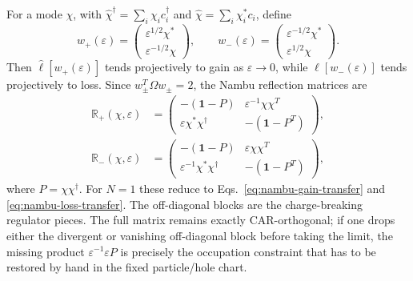 \documentclass[aps,prb,onecolumn,nofootinbib,superscriptaddress]{revtex4-2}
\newcommand{\I}{\mathbf{1}}
\theoremstyle{plain}
\theoremstyle{definition}
\begin{document}
For a mode \(\chi\), with
\(\hat\chi^\dagger=\sum_i\chi_i c_i^\dagger\) and
\(\hat\chi=\sum_i\chi_i^*c_i\), define
\begin{equation}
  w_+(\varepsilon)=
  \begin{pmatrix}\varepsilon^{1/2}\chi^*\\ \varepsilon^{-1/2}\chi\end{pmatrix},
  \qquad
  w_-(\varepsilon)=
  \begin{pmatrix}\varepsilon^{-1/2}\chi^*\\ \varepsilon^{1/2}\chi\end{pmatrix} .
  \label{eq:nambu-regulated-gain-loss-vectors}
\end{equation}
Then \(\hat\ell[w_+(\varepsilon)]\) tends projectively to gain as
\(\varepsilon\to0\), while \(\hat\ell[w_-(\varepsilon)]\) tends projectively
to loss.  Since \(w_\pm^T\Omega w_\pm=2\), the Nambu reflection matrices are
\begin{align}
  \mathbb R_+(\chi,\varepsilon)
  &=
  \begin{pmatrix}
    -(\I-P) & \varepsilon^{-1}\chi\chi^T\\
    \varepsilon\chi^*\chi^\dagger & -(\I-P^T)
  \end{pmatrix},
  \label{eq:nambu-regulated-gain-matrix}\\
  \mathbb R_-(\chi,\varepsilon)
  &=
  \begin{pmatrix}
    -(\I-P) & \varepsilon\chi\chi^T\\
    \varepsilon^{-1}\chi^*\chi^\dagger & -(\I-P^T)
  \end{pmatrix},
  \label{eq:nambu-regulated-loss-matrix}
\end{align}
where \(P=\chi\chi^\dagger\).  For \(N=1\) these reduce to
Eqs.~\eqref{eq:nambu-gain-transfer} and \eqref{eq:nambu-loss-transfer}.
The off-diagonal blocks are the charge-breaking regulator pieces.  The full
matrix remains exactly CAR-orthogonal; if one drops either the divergent or
vanishing off-diagonal block before taking the limit, the missing product
\(\varepsilon^{-1}\varepsilon P\) is precisely the occupation constraint that
has to be restored by hand in the fixed particle/hole chart.
\end{document}
